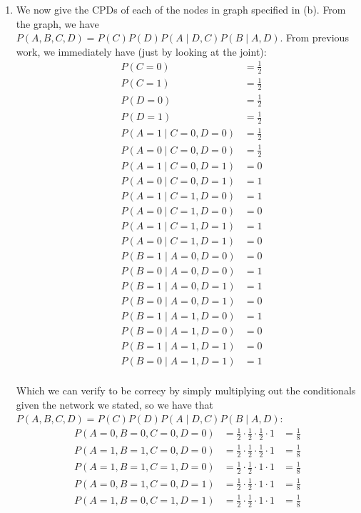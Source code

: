 \documentclass[12pt]{article}
\begin{document}
\begin{enumerate}[label=(\alph*)]
\item We now give the CPDs of each of the nodes in graph specified in (b). From the graph, we have $P(A,B,C,D) = P(C)P(D)P(A \mid D,C)P(B\mid A,D)$. From previous work, we immediately have (just by looking at the joint):
\begin{align*}
&P(C = 0) &= \frac{1}{2} \\
&P(C = 1) &= \frac{1}{2} \\
&P(D = 0) &= \frac{1}{2} \\
&P(D = 1) &= \frac{1}{2} \\
&P(A = 1\mid C = 0,D = 0) &= \frac{1}{2} \\
&P(A = 0\mid C = 0,D = 0) &= \frac{1}{2} \\
&P(A = 1\mid C = 0,D = 1) &= 0 \\
&P(A = 0\mid C = 0,D = 1) &= 1 \\
&P(A = 1\mid C = 1,D = 0) &= 1 \\
&P(A = 0\mid C = 1,D = 0) &= 0 \\ 
&P(A = 1\mid C = 1,D = 1) &= 1 \\
&P(A = 0\mid C = 1,D = 1) &= 0 \\
&P(B = 1\mid A = 0,D = 0) &= 0 \\
&P(B = 0\mid A = 0,D = 0) &= 1 \\
&P(B = 1\mid A = 0,D = 1) &= 1 \\
&P(B = 0\mid A = 0,D = 1) &= 0 \\
&P(B = 1\mid A = 1,D = 0) &= 1 \\
&P(B = 0\mid A = 1,D = 0) &= 0 \\ 
&P(B = 1\mid A = 1,D = 1) &= 0 \\
&P(B = 0\mid A = 1,D = 1) &= 1 \\
\end{align*}

Which we can verify to be correcy by simply multiplying out the conditionals given the network we stated, so we have that $P(A,B,C,D) = P(C)P(D)P(A \mid D,C)P(B \mid A, D)$:
\begin{align*}
P(A= 0, B = 0, C =0, D = 0) & = \frac{1}{2} \cdot \frac{1}{2} \cdot \frac{1}{2} \cdot 1 &= \frac{1}{8} \\
P(A= 1, B = 1, C =0, D = 0) & = \frac{1}{2} \cdot \frac{1}{2} \cdot \frac{1}{2} \cdot 1 &= \frac{1}{8} \\
P(A= 1, B = 1, C =1, D = 0) & = \frac{1}{2} \cdot \frac{1}{2} \cdot 1 \cdot 1 &= \frac{1}{8} \\
P(A= 0, B = 1, C =0, D = 1) & = \frac{1}{2} \cdot \frac{1}{2} \cdot 1 \cdot 1 &= \frac{1}{8} \\
P(A= 1, B = 0, C =1, D = 1) & = \frac{1}{2} \cdot \frac{1}{2} \cdot 1 \cdot 1 &= \frac{1}{8}
\end{align*}
\end{enumerate}
\end{document}
